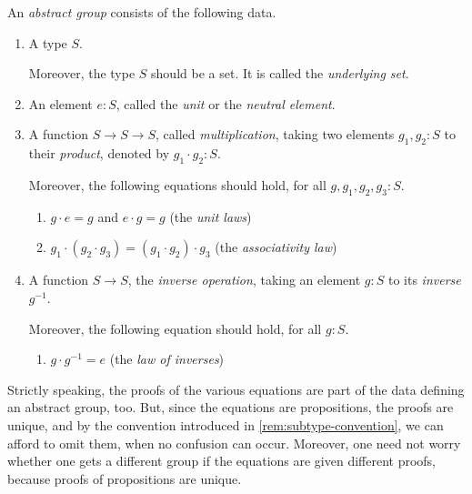 \begin{definition}\label{def:abstractgroup}
  An \emph{abstract group} consists of the following data.
  \begin{enumerate}
  \item\label{struc:under-set} A type $S$.
    \par \noindent
    Moreover, the type $S$ should be a set.  It is called the \emph{underlying set}.
  \item\label{struc:unit} An element $e:S$, called the \emph{unit} or the \emph{neutral element}.
  \item\label{struc:mult-op} A function $S\to S\to S$, called \emph{multiplication},
    taking two elements $g_1,g_2:S$ to their \emph{product}, denoted by $g_1\cdot g_2:S$.
    \par \noindent
    Moreover, the following equations should hold, for all $g,g_1,g_2,g_3 : S$.
    \begin{enumerate}[label=(\alph*),ref=\ref{struc:mult-op} (\alph*)]
    \item\label{axiom:unit-laws} $g\cdot e=g$ and $e\cdot g=g$ (the \emph{unit laws})
    \item\label{axiom:ass-law} $g_1\cdot(g_2\cdot g_3)=(g_1\cdot g_2)\cdot g_3$ (the \emph{associativity law})
    \end{enumerate}
  \item\label{struc:inv-op} A function $S\to S$, the \emph{inverse operation},
    taking an element $g:S$ to its \emph{inverse} $g^{-1}$.
    \par \noindent
    Moreover, the following equation should hold, for all $g:S$.
    \begin{enumerate}[label=(\alph*),ref=\ref{struc:inv-op} (\alph*)]
    \item\label{axiom:inv-law} $ g\cdot g^{-1} = e$ (the \emph{law of inverses})
    \qedhere
    \end{enumerate}
  \end{enumerate}
\end{definition}

\begin{remark}
  Strictly speaking, the proofs of the various equations are part of the data defining an abstract group, too.  But, since the equations are
  propositions, the proofs are unique, and by the convention introduced in \cref{rem:subtype-convention}, we can afford to omit them, when no confusion can occur.  Moreover, one need not worry whether one gets a different group if the equations are given different proofs, because proofs of
  propositions are unique.
\end{remark}

